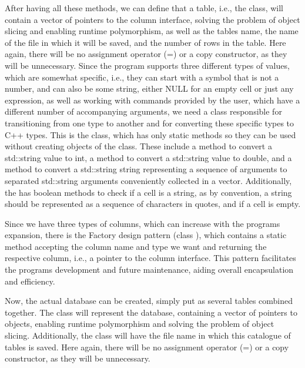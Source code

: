 After having all these methods, we can define that a table, i.\+e., the  class, will contain a vector of pointers to the column interface, solving the problem of object slicing and enabling runtime polymorphism, as well as the table\textquotesingle{}s name, the name of the file in which it will be saved, and the number of rows in the table. Here again, there will be no assignment operator (=) or a copy constructor, as they will be unnecessary. Since the program supports three different types of values, which are somewhat specific, i.\+e., they can start with a symbol that is not a number, and can also be some string, either NULL for an empty cell or just any expression, as well as working with commands provided by the user, which have a different number of accompanying arguments, we need a class responsible for transitioning from one type to another and for converting these specific types to C++ types. This is the  class, which has only static methods so they can be used without creating objects of the  class. These include a method to convert a std\+::string value to int, a method to convert a std\+::string value to double, and a method to convert a std\+::string string representing a sequence of arguments to separated std\+::string arguments conveniently collected in a vector. Additionally, the  has boolean methods to check if a cell is a string, as by convention, a string should be represented as a sequence of characters in quotes, and if a cell is empty.

Since we have three types of columns, which can increase with the program\textquotesingle{}s expansion, there is the Factory design pattern (class ), which contains a static method accepting the column name and type we want and returning the respective column, i.\+e., a pointer to the column interface. This pattern facilitates the program\textquotesingle{}s development and future maintenance, aiding overall encapsulation and efficiency.

Now, the actual database can be created, simply put as several tables combined together. The  class will represent the database, containing a vector of pointers to  objects, enabling runtime polymorphism and solving the problem of object slicing. Additionally, the  class will have the file name in which this catalogue of tables is saved. Here again, there will be no assignment operator (=) or a copy constructor, as they will be unnecessary.


